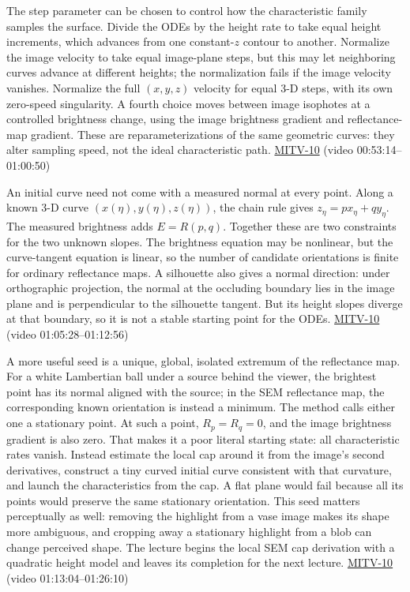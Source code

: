 The step parameter can be chosen to control how the characteristic family samples the surface. Divide the ODEs by the height rate to take equal height increments, which advances from one constant-\(z\) contour to another. Normalize the image velocity to take equal image-plane steps, but this may let neighboring curves advance at different heights; the normalization fails if the image velocity vanishes. Normalize the full \((x,y,z)\) velocity for equal 3-D steps, with its own zero-speed singularity. A fourth choice moves between image isophotes at a controlled brightness change, using the image brightness gradient and reflectance-map gradient. These are reparameterizations of the same geometric curves: they alter sampling speed, not the ideal characteristic path. \hyperref[04-visual-computing-ii-ch036]{MITV-10} (video 00:53:14--01:00:50)

An initial curve need not come with a measured normal at every point. Along a known 3-D curve \((x(\eta),y(\eta),z(\eta))\), the chain rule gives \(z_\eta=p x_\eta+q y_\eta\). The measured brightness adds \(E=R(p,q)\). Together these are two constraints for the two unknown slopes. The brightness equation may be nonlinear, but the curve-tangent equation is linear, so the number of candidate orientations is finite for ordinary reflectance maps. A silhouette also gives a normal direction: under orthographic projection, the normal at the occluding boundary lies in the image plane and is perpendicular to the silhouette tangent. But its height slopes diverge at that boundary, so it is not a stable starting point for the ODEs. \hyperref[04-visual-computing-ii-ch036]{MITV-10} (video 01:05:28--01:12:56)

A more useful seed is a unique, global, isolated extremum of the reflectance map. For a white Lambertian ball under a source behind the viewer, the brightest point has its normal aligned with the source; in the SEM reflectance map, the corresponding known orientation is instead a minimum. The method calls either one a stationary point. At such a point, \(R_p=R_q=0\), and the image brightness gradient is also zero. That makes it a poor literal starting state: all characteristic rates vanish. Instead estimate the local cap around it from the image's second derivatives, construct a tiny curved initial curve consistent with that curvature, and launch the characteristics from the cap. A flat plane would fail because all its points would preserve the same stationary orientation. This seed matters perceptually as well: removing the highlight from a vase image makes its shape more ambiguous, and cropping away a stationary highlight from a blob can change perceived shape. The lecture begins the local SEM cap derivation with a quadratic height model and leaves its completion for the next lecture. \hyperref[04-visual-computing-ii-ch036]{MITV-10} (video 01:13:04--01:26:10)

